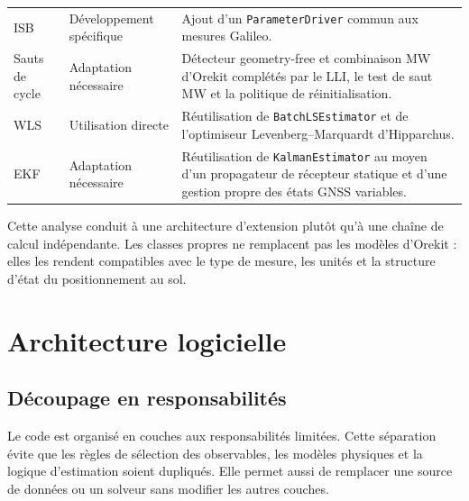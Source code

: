\begin{table}[H]
\begin{tabularx}{\textwidth}{p{3.3cm} p{3.0cm} X}
ISB & Développement spécifique &
Ajout d'un \texttt{ParameterDriver} commun aux mesures Galileo. \\

Sauts de cycle & Adaptation nécessaire &
Détecteur geometry-free et combinaison MW d'Orekit complétés par le LLI, le
test de saut MW et la politique de réinitialisation. \\

WLS & Utilisation directe &
Réutilisation de \texttt{BatchLSEstimator} et de l'optimiseur
Levenberg--Marquardt d'Hipparchus. \\

EKF & Adaptation nécessaire &
Réutilisation de \texttt{KalmanEstimator} au moyen d'un propagateur de
récepteur statique et d'une gestion propre des états GNSS variables. \\
\hline
\end{tabularx}
\end{table}

Cette analyse conduit à une architecture d'extension plutôt qu'à une chaîne
de calcul indépendante. Les classes propres ne remplacent pas les modèles
d'Orekit : elles les rendent compatibles avec le type de mesure, les unités et
la structure d'état du positionnement au sol.


\section{Architecture logicielle}
\label{sec:software_architecture}

\subsection{Découpage en responsabilités}

Le code est organisé en couches aux responsabilités limitées. Cette séparation
évite que les règles de sélection des observables, les modèles physiques et la
logique d'estimation soient dupliqués. Elle permet aussi de remplacer une
source de données ou un solveur sans modifier les autres couches.

